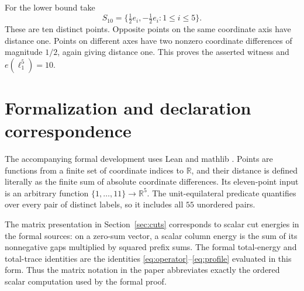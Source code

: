 \documentclass[11pt]{article}
\theoremstyle{definition}
\theoremstyle{remark}
\newcommand{\R}{\mathbb R}
\begin{document}
For the lower bound take
\[
 S_{10}=\{\tfrac12 e_i,-\tfrac12 e_i:1\leq i\leq5\}.
\]
These are ten distinct points. Opposite points on the same coordinate
axis have distance one. Points on different axes have two nonzero
coordinate differences of magnitude $1/2$, again giving distance one.
This proves the asserted witness and $e(\ell_1^5)=10$.

\section{Formalization and declaration correspondence}\label{sec:formalization}

The accompanying formal development uses Lean and mathlib
\cite{Lean2021,Mathlib2020}. Points are functions from a finite set of
coordinate indices to $\R$, and their distance is defined literally as
the finite sum of absolute coordinate differences. Its eleven-point
input is an arbitrary function $\{1,\ldots,11\}\to\R^5$.
The unit-equilateral predicate quantifies over every pair of distinct
labels, so it includes all $55$ unordered pairs.

The matrix presentation in Section~\ref{sec:cuts} corresponds to scalar
cut energies in the formal sources: on a zero-sum vector, a scalar
column energy is the sum of its nonnegative gaps multiplied by squared
prefix sums. The formal total-energy and total-trace identities are
the identities \eqref{eq:operator}--\eqref{eq:profile} evaluated in
this form. Thus the matrix notation in the paper abbreviates exactly
the ordered scalar computation used by the formal proof.
\end{document}
